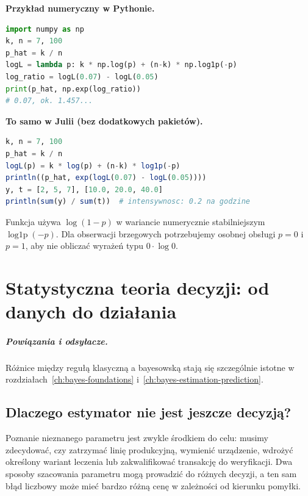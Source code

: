 \documentclass[11pt,a4paper,oneside]{report}
\numberwithin{equation}{chapter}
\theoremstyle{plain}
\theoremstyle{definition}
\theoremstyle{remark}
\begin{document}
\noindent\textbf{Przykład numeryczny w Pythonie.}\par
\par
{}
\smallskip
\begin{lstlisting}[language=Python,caption={Wiarygodność modelu Bernoulliego i iloraz wiarygodności (Python).}]
import numpy as np
k, n = 7, 100
p_hat = k / n
logL = lambda p: k * np.log(p) + (n-k) * np.log1p(-p)
log_ratio = logL(0.07) - logL(0.05)
print(p_hat, np.exp(log_ratio))
# 0.07, ok. 1.457...
\end{lstlisting}
\noindent\textbf{To samo w Julii (bez dodatkowych pakietów).}\par
\par
{}
\smallskip
\begin{lstlisting}[language=Julia,caption={Wiarygodność Bernoulliego i intensywność Poissona (Julia).}]
k, n = 7, 100
p_hat = k / n
logL(p) = k * log(p) + (n-k) * log1p(-p)
println((p_hat, exp(logL(0.07) - logL(0.05))))
y, t = [2, 5, 7], [10.0, 20.0, 40.0]
println(sum(y) / sum(t))  # intensywnosc: 0.2 na godzine
\end{lstlisting}

Funkcja używa $\log(1-p)$ w wariancie numerycznie stabilniejszym
$\operatorname{log1p}(-p)$. Dla obserwacji brzegowych potrzebujemy
osobnej obsługi $p=0$ i $p=1$, aby nie obliczać wyrażeń typu $0\cdot\log0$.

\chapter{Statystyczna teoria decyzji: od danych do działania}
\label{ch:decision}
\paragraph{Powiązania i odsyłacze.} Różnice między regułą klasyczną a bayesowską stają się szczególnie istotne w rozdziałach~\ref{ch:bayes-foundations} i~\ref{ch:bayes-estimation-prediction}.


\section{Dlaczego estymator nie jest jeszcze decyzją?}
Poznanie nieznanego parametru jest zwykle środkiem do celu: musimy
zdecydować, czy zatrzymać linię produkcyjną, wymienić urządzenie,
wdrożyć określony wariant leczenia lub zakwalifikować transakcję do
weryfikacji. Dwa sposoby szacowania parametru mogą prowadzić do
różnych decyzji, a ten sam błąd liczbowy może mieć bardzo różną cenę
w zależności od kierunku pomyłki.
\end{document}
